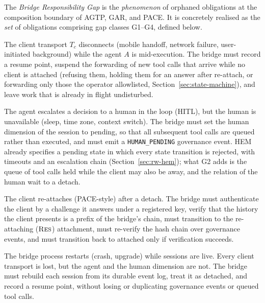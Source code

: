 \begin{definition}\label{def:gap}
The \emph{Bridge Responsibility Gap} is the \emph{phenomenon} of
orphaned obligations at the composition boundary of AGTP, GAR, and PACE.
It is concretely realised as the \emph{set} of obligations comprising
gap classes G1--G4, defined below.

\begin{description}[leftmargin=2em]
\item[G1. Client-Detach-But-Agent-Continues.] The client transport $T_c$
disconnects (mobile handoff, network failure, user-initiated background)
while the agent $A$ is mid-execution. The bridge must record a
resume point, suspend the forwarding of new tool calls that arrive
while no client is attached (refusing them, holding them for an answer
after re-attach, or forwarding only those the operator allowlisted,
Section~\ref{sec:state-machine}), and leave work that is already in
flight undisturbed.

\item[G2. Human-Escalation-Pending.] The agent escalates a decision to a
human in the loop (HITL), but the human is unavailable (sleep, time zone,
context switch). The bridge must set the human dimension of the session to pending, so that all
subsequent tool calls are queued rather than executed, and
must emit a \texttt{HUMAN\_PENDING} governance event. HEM already
specifies a pending state in which every state transition is rejected, with
timeouts and an escalation chain (Section~\ref{sec:rw-hem}); what G2 adds
is the queue of tool calls held while the client may also be away, and the
relation of the human wait to a detach.

\item[G3. Resume-After-Detach.] The client re-attaches
(PACE-style) after a detach. The bridge must authenticate the client
by a challenge it answers under a registered key, verify that the
history the client presents is a prefix of the bridge's chain, must transition to the re-attaching ($\textsc{Res}$)
attachment, must re-verify the hash chain over governance events, and
must transition back to attached only if verification succeeds.

\item[G4. Bridge-Restart-With-Live-Sessions.] The bridge process
restarts (crash, upgrade) while sessions are live. Every client
transport is lost, but the agent and the human dimension are not. The
bridge must rebuild each session from its durable event log, treat it as
detached, and record a resume point, without losing or duplicating
governance events or queued tool calls.
\end{description}
\end{definition}

